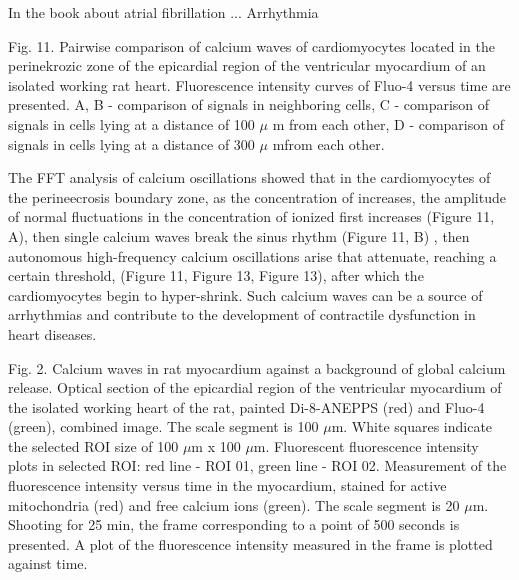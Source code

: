 \documentclass{biophys-new}
\begin{document}
In the book \cite{kockskamper2002subcellular} about atrial fibrillation ...
Arrhythmia


Fig. 11. Pairwise comparison of calcium waves of cardiomyocytes located in the perinekrozic zone of the epicardial region of the ventricular myocardium of an isolated working rat heart. Fluorescence intensity curves of Fluo-4 versus time are presented. A, B - comparison of signals in neighboring cells, C - comparison of signals in cells lying at a distance of 100 $\mu$ m from each other, D - comparison of signals in cells lying at a distance of 300 $\mu$  mfrom each other.


The FFT analysis of calcium oscillations showed that in the cardiomyocytes of the perineecrosis boundary zone, as the concentration of  increases, the amplitude of normal fluctuations in the concentration of ionized  first increases (Figure 11, A), then single calcium waves break the sinus rhythm (Figure 11, B) , then autonomous high-frequency calcium oscillations arise that attenuate, reaching a certain threshold, (Figure 11, Figure 13, Figure 13), after which the cardiomyocytes begin to hyper-shrink. Such calcium waves can be a source of arrhythmias and contribute to the development of contractile dysfunction in heart diseases.


Fig. 2.  Calcium waves in rat myocardium against a background of global calcium release.
Optical section of the epicardial region of the ventricular myocardium of the isolated working heart of the rat, painted Di-8-ANEPPS (red) and Fluo-4 (green), combined image.
The scale segment is 100 $\mu$m.
White squares indicate the selected ROI size of 100 $\mu$m x 100 $\mu$m.
Fluorescent fluorescence intensity plots in selected ROI: red line - ROI 01, green line - ROI 02.
Measurement of the fluorescence intensity versus time in the myocardium, stained for active mitochondria (red) and free calcium ions (green).
The scale segment is 20 $\mu$m. Shooting for 25 min, the frame corresponding to a point of 500 seconds is presented.
A plot of the fluorescence intensity measured in the frame is plotted against time.
\end{document}
